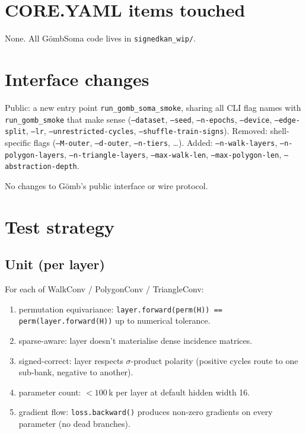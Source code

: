 \documentclass[11pt,a4paper]{article}
\newcommand{\sig}{\ensuremath{\sigma}}
\newcommand{\Gomb}{G\"omb}
\newcommand{\Soma}{G\"ombSoma}
\begin{document}
\section{CORE.YAML items touched}

None. All \Soma{} code lives in \texttt{signedkan\_wip/}.

\section{Interface changes}

Public: a new entry point \texttt{run\_gomb\_soma\_smoke}, sharing all
CLI flag names with \texttt{run\_gomb\_smoke} that make sense
(\texttt{--dataset}, \texttt{--seed}, \texttt{--n-epochs},
\texttt{--device}, \texttt{--edge-split}, \texttt{--lr},
\texttt{--unrestricted-cycles}, \texttt{--shuffle-train-signs}).
Removed: shell-specific flags (\texttt{--M-outer},
\texttt{--d-outer}, \texttt{--n-tiers}, \ldots). Added:
\texttt{--n-walk-layers}, \texttt{--n-polygon-layers},
\texttt{--n-triangle-layers}, \texttt{--max-walk-len},
\texttt{--max-polygon-len}, \texttt{--abstraction-depth}.

No changes to \Gomb's public interface or wire protocol.

\section{Test strategy}

\subsection{Unit (per layer)}

For each of WalkConv / PolygonConv / TriangleConv:
\begin{enumerate}
\item permutation equivariance: \texttt{layer.forward(perm(H)) == perm(layer.forward(H))} up to numerical tolerance.
\item sparse-aware: layer doesn't materialise dense incidence matrices.
\item signed-correct: layer respects $\sig$-product polarity (positive cycles route to one sub-bank, negative to another).
\item parameter count: $< 100$\,k per layer at default hidden width 16.
\item gradient flow: \texttt{loss.backward()} produces non-zero gradients on every parameter (no dead branches).
\end{enumerate}
\end{document}
